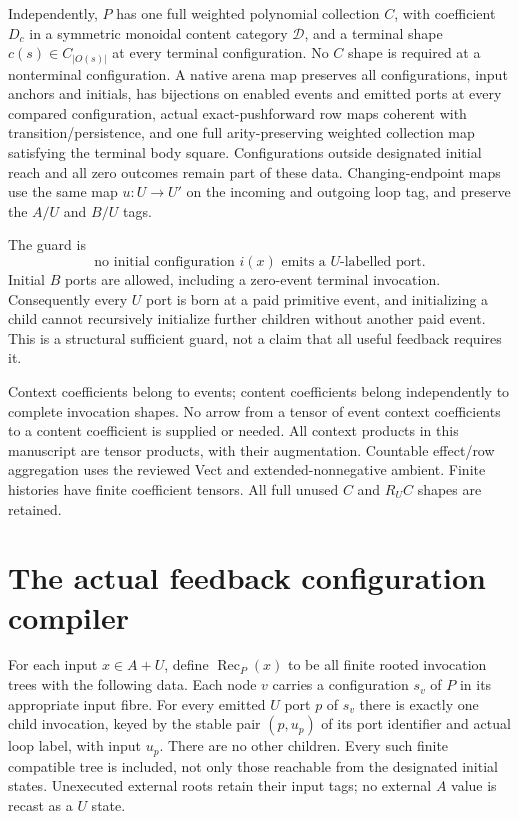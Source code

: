 \documentclass[11pt]{article}
\begin{document}
Independently, $P$ has one full weighted polynomial collection $C$, with coefficient $D_c$ in a symmetric monoidal content category $\mathcal D$, and a terminal shape $c(s)\in C_{|O(s)|}$ at every terminal configuration. No $C$ shape is required at a nonterminal configuration. A native arena map preserves all configurations, input anchors and initials, has bijections on enabled events and emitted ports at every compared configuration, actual exact-pushforward row maps coherent with transition/persistence, and one full arity-preserving weighted collection map satisfying the terminal body square. Configurations outside designated initial reach and all zero outcomes remain part of these data. Changing-endpoint maps use the same map $u:U\to U'$ on the incoming and outgoing loop tag, and preserve the $A/U$ and $B/U$ tags.

The guard is
\[
 \text{no initial configuration }i(x)\text{ emits a }U\text{-labelled port}. \tag{G}
\]
Initial $B$ ports are allowed, including a zero-event terminal invocation. Consequently every $U$ port is born at a paid primitive event, and initializing a child cannot recursively initialize further children without another paid event. This is a structural sufficient guard, not a claim that all useful feedback requires it.

Context coefficients belong to events; content coefficients belong independently to complete invocation shapes. No arrow from a tensor of event context coefficients to a content coefficient is supplied or needed. All context products in this manuscript are tensor products, with their augmentation. Countable effect/row aggregation uses the reviewed Vect and extended-nonnegative ambient. Finite histories have finite coefficient tensors. All full unused $C$ and $R_UC$ shapes are retained.

\section{The actual feedback configuration compiler}
For each input $x\in A+U$, define $\operatorname{Rec}_P(x)$ to be all finite rooted invocation trees with the following data. Each node $v$ carries a configuration $s_v$ of $P$ in its appropriate input fibre. For every emitted $U$ port $p$ of $s_v$ there is exactly one child invocation, keyed by the stable pair $(p,u_p)$ of its port identifier and actual loop label, with input $u_p$. There are no other children. Every such finite compatible tree is included, not only those reachable from the designated initial states. Unexecuted external roots retain their input tags; no external $A$ value is recast as a $U$ state.
\end{document}
